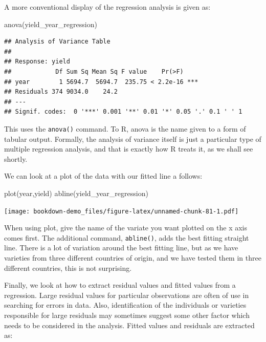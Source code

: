 \documentclass[
]{book}
\newenvironment{Shaded}{\begin{snugshade}}{\end{snugshade}}
\newcommand{\FunctionTok}[1]{\textcolor[rgb]{0.00,0.00,0.00}{#1}}
\newcommand{\NormalTok}[1]{#1}
\begin{document}
A more conventional display of the regression analysis is given as:

\begin{Shaded}
\begin{Highlighting}[]
\FunctionTok{anova}\NormalTok{(yield\_year\_regression)}
\end{Highlighting}
\end{Shaded}

\begin{verbatim}
## Analysis of Variance Table
## 
## Response: yield
##            Df Sum Sq Mean Sq F value    Pr(>F)    
## year        1 5694.7  5694.7  235.75 < 2.2e-16 ***
## Residuals 374 9034.0    24.2                      
## ---
## Signif. codes:  0 '***' 0.001 '**' 0.01 '*' 0.05 '.' 0.1 ' ' 1
\end{verbatim}

This uses the \texttt{anova()} command. To R, anova is the name given to a form of tabular output. Formally, the analysis of variance itself is just a particular type of multiple regression analysis, and that is exactly how R treats it, as we shall see shortly.

We can look at a plot of the data with our fitted line a follows:

\begin{Shaded}
\begin{Highlighting}[]
\FunctionTok{plot}\NormalTok{(year,yield)}
\FunctionTok{abline}\NormalTok{(yield\_year\_regression)}
\end{Highlighting}
\end{Shaded}

\texttt{[image: bookdown-demo\_files/figure-latex/unnamed-chunk-81-1.pdf]}

When using plot, give the name of the variate you want plotted on the x axis comes first. The additional command, \texttt{abline()}, adds the best fitting straight line. There is a lot of variation around the best fitting line, but as we have varieties from three different countries of origin, and we have tested them in three different countries, this is not surprising.

Finally, we look at how to extract residual values and fitted values from a regression. Large residual values for particular observations are often of use in searching for errors in data. Also, identification of the individuals or varieties responsible for large residuals may sometimes suggest some other factor which needs to be considered in the analysis. Fitted values and residuals are extracted as:
\end{document}
